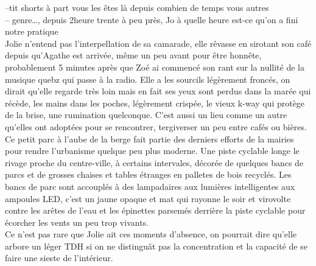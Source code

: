 \documentclass{article}
\begin{document}
--tit shorts à part vous les êtes là depuis combien de temps vous
autres\\
-- genre\ldots, depuis 2heure trente à peu près, Jo à quelle
heure est-ce qu'on a fini notre pratique\\

Jolie n'entend pas l'interpellation de sa camarade, elle rêvasse en sirotant
son café depuis qu'Agathe est arrivée, même un peu avant pour être honnête,
probablement 5 minutes après que Zoé ai commencé son rant sur la nullité
de la musique quebz qui passe à la radio. Elle a les sourcils légèrement
froncés, on dirait qu'elle regarde très loin mais en fait ses yeux sont perdus
dans la marée qui récède, les mains dans les poches, légèrement crispée, le
vieux k-way qui protège de la brise, une rumination quelconque.
C'est aussi un lieu comme un autre qu'elles ont adoptées pour se rencontrer,
tergiverser un peu entre cafés ou bières. Ce petit parc à l'aube de la berge
fait partie des derniers efforts de la mairies pour rendre l'urbanisme quelque
peu plus moderne. Une piste cyclable longe le rivage proche du
centre-ville, à certains intervales, décorée de quelques bancs de parcs et
de grosses chaises et tables étranges en palletes de bois recyclés. Les bancs
de parc sont accouplés à des lampadaires aux lumières intelligentes aux ampoules
LED, c'est un jaune opaque et mat qui rayonne le soir et virovolte contre les
arêtes de l'eau et les épinettes parsemés derrière la piste cyclable pour
écorcher les vents un peu trop vivants. \\

Ce n'est pas rare que Jolie ait ces moments d'absence, on pourrait dire qu'elle
arbore un léger TDH si on ne distinguât pas la concentration et la capacité
de se faire une sieste de l'intérieur.
\end{document}
